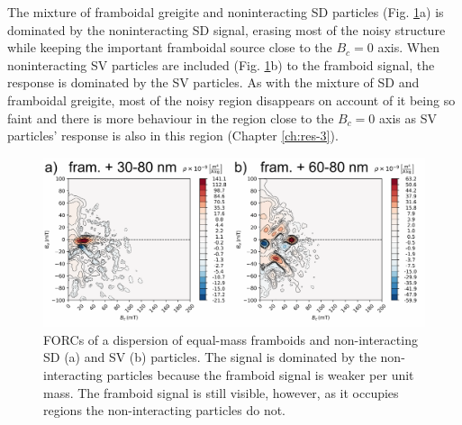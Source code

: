 The mixture of framboidal greigite and noninteracting SD particles (Fig. \ref{FIG_F04}a) is dominated by the noninteracting SD signal, erasing most of the noisy structure while keeping the important framboidal source close to the $B_c=0$ axis. When noninteracting SV particles are included (Fig. \ref{FIG_F04}b) to the framboid signal, the response is dominated by the SV particles. As with the mixture of SD and framboidal greigite, most of the noisy region disappears on account of it being so faint and there is more behaviour in the region close to the $B_c=0$ axis as SV particles' response is also in this region (Chapter \ref{ch:res-3}).
\begin{figure}
\centering
\includegraphics[width=\textwidth]{research-4/figs/forc_mix.pdf}
\caption[FORCs of a dispersion of framboids and non-interacting particles]{FORCs of a dispersion of equal-mass framboids and non-interacting SD (a) and SV (b) particles. The signal is dominated by the non-interacting particles because the framboid signal is weaker per unit mass. The framboid signal is still visible, however, as it occupies regions the non-interacting particles do not.}
\label{FIG_F04}
\end{figure}
\par

